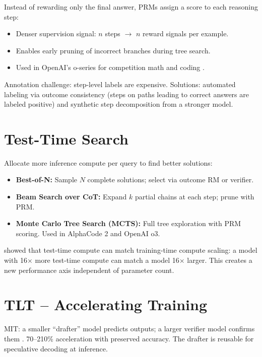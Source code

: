 Instead of rewarding only the final answer, PRMs assign a score to each reasoning step:
\begin{itemize}
  \item Denser supervision signal: $n$ steps $\rightarrow$ $n$ reward signals per example.
  \item Enables early pruning of incorrect branches during tree search.
  \item Used in OpenAI's o-series for competition math and coding \parencite{lightman2023lets}.
\end{itemize}

Annotation challenge: step-level labels are expensive. Solutions: automated labeling via outcome consistency (steps on paths leading to correct answers are labeled positive) and synthetic step decomposition from a stronger model.

\section{Test-Time Search}

Allocate more inference compute per query to find better solutions:
\begin{itemize}
  \item \textbf{Best-of-N:} Sample $N$ complete solutions; select via outcome RM or verifier.
  \item \textbf{Beam Search over CoT:} Expand $k$ partial chains at each step; prune with PRM.
  \item \textbf{Monte Carlo Tree Search (MCTS):} Full tree exploration with PRM scoring. Used in AlphaCode 2 and OpenAI o3.
\end{itemize}

\begin{keyinsight}
\textcite{snell2024scaling} showed that test-time compute can match training-time compute scaling: a model with 16$\times$ more test-time compute can match a model 16$\times$ larger. This creates a new performance axis independent of parameter count.
\end{keyinsight}

\section{TLT -- Accelerating Training}

MIT: a smaller ``drafter'' model predicts outputs; a larger verifier model confirms them \parencite{leviathan2023fast}. 70--210\% acceleration with preserved accuracy. The drafter is reusable for speculative decoding at inference.

